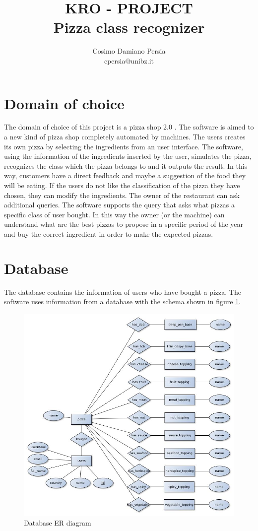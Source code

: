\documentclass[10pt,a4paper]{article}
\author{Cosimo Damiano Persia\\cpersia@unibz.it}
\title{KRO - PROJECT\\Pizza class recognizer}
\begin{document}
\maketitle

\section{Domain of choice}
The domain of choice of this project is a pizza shop 2.0 . The software is aimed to a new kind of pizza shop completely automated by machines. The users creates its own pizza by selecting the ingredients from an user interface.  The software, using the information of the ingredients inserted by the user, simulates the pizza, recognizes the class which the pizza belongs to and it outputs the result. In this way, customers have a direct feedback and maybe a suggestion of the food they will be eating. If the users do not like the classification of the pizza they have chosen, they can modify the ingredients. 
The owner of the restaurant can ask additional queries. The software supports the query that asks what pizzas a specific class of user bought. In this way the owner (or the machine) can understand what are the best pizzas to propose in a specific period of the year and buy the correct ingredient in order to make the expected pizzas. 


\section{Database}
The database contains the information of users who have bought a pizza.
The software uses information from a database with the schema shown in figure \ref{DBSCHEMA}.

\begin{figure}
  \includegraphics[width=\linewidth]{database_schema.jpg}
  \caption{Database ER diagram}
  \label{DBSCHEMA}
\end{figure}
\end{document}
